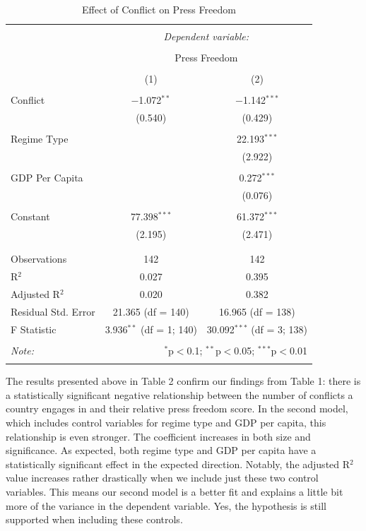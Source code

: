 \documentclass[12pt]{article}
\begin{document}
\begin{enumerate}
\begin{table}[!htbp] \centering 
  \caption{Effect of Conflict on Press Freedom} 
  \label{} 
\begin{tabular}{@{\extracolsep{5pt}}lcc} 
\\[-1.8ex]\hline 
\hline \\[-1.8ex] 
 & \multicolumn{2}{c}{\textit{Dependent variable:}} \\ 
\cline{2-3} 
\\[-1.8ex] & \multicolumn{2}{c}{Press Freedom} \\ 
\\[-1.8ex] & (1) & (2)\\ 
\hline \\[-1.8ex] 
 Conflict & $-$1.072$^{**}$ & $-$1.142$^{***}$ \\ 
  & (0.540) & (0.429) \\ 
  & & \\ 
 Regime Type &  & 22.193$^{***}$ \\ 
  &  & (2.922) \\ 
  & & \\ 
 GDP Per Capita &  & 0.272$^{***}$ \\ 
  &  & (0.076) \\ 
  & & \\ 
 Constant & 77.398$^{***}$ & 61.372$^{***}$ \\ 
  & (2.195) & (2.471) \\ 
  & & \\ 
\hline \\[-1.8ex] 
Observations & 142 & 142 \\ 
R$^{2}$ & 0.027 & 0.395 \\ 
Adjusted R$^{2}$ & 0.020 & 0.382 \\ 
Residual Std. Error & 21.365 (df = 140) & 16.965 (df = 138) \\ 
F Statistic & 3.936$^{**}$ (df = 1; 140) & 30.092$^{***}$ (df = 3; 138) \\ 
\hline 
\hline \\[-1.8ex] 
\textit{Note:}  & \multicolumn{2}{r}{$^{*}$p$<$0.1; $^{**}$p$<$0.05; $^{***}$p$<$0.01} \\ 
\normalsize 
\end{tabular} 
\end{table} 
The results presented above in Table 2 confirm our findings from Table 1: there is a statistically significant negative relationship between the number of conflicts a country engages in and their relative press freedom score.  In the second model, which includes control variables for regime type and GDP per capita, this relationship is even stronger.  The coefficient increases in both size and significance.  As expected, both regime type and GDP per capita have a statistically significant effect in the expected direction.  Notably, the adjusted R$^2$ value increases rather drastically when we include just these two control variables.  This means our second model is a better fit and explains a little bit more of the variance in the dependent variable.  Yes, the hypothesis is still supported when including these controls.

\end{enumerate}
\end{document}
